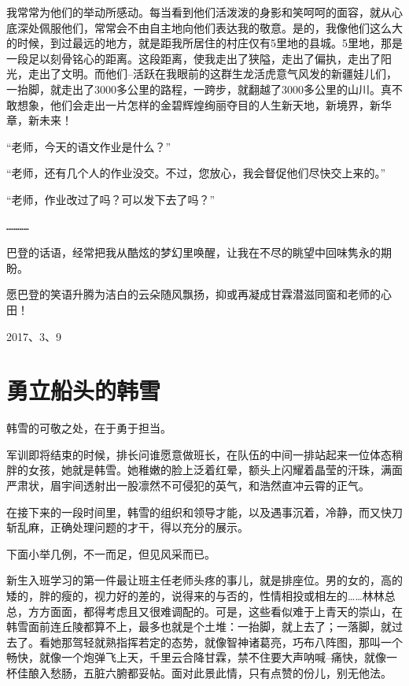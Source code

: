 \documentclass[openany]{ctexbook}
\begin{document}
我常常为他们的举动所感动。每当看到他们活泼泼的身影和笑呵呵的面容，就从心底深处佩服他们，常常会不由自主地向他们表达我的敬意。是的，我像他们这么大的时候，到过最远的地方，就是距我所居住的村庄仅有5里地的县城。5里地，那是一段足以刻骨铭心的距离。这段距离，使我走出了狭隘，走出了偏执，走出了阳光，走出了文明。而他们--活跃在我眼前的这群生龙活虎意气风发的新疆娃儿们，一抬脚，就走出了3000多公里的路程，一跨步，就翻越了3000多公里的山川。真不敢想象，他们会走出一片怎样的金碧辉煌绚丽夺目的人生新天地，新境界，新华章，新未来！

``老师，今天的语文作业是什么？''

``老师，还有几个人的作业没交。不过，您放心，我会督促他们尽快交上来的。''

``老师，作业改过了吗？可以发下去了吗？''

\begin{verbatim}
…………
\end{verbatim}

巴登的话语，经常把我从酷炫的梦幻里唤醒，让我在不尽的眺望中回味隽永的期盼。

愿巴登的笑语升腾为洁白的云朵随风飘扬，抑或再凝成甘霖潜滋同窗和老师的心田！

2017、3、9

\chapter*{勇立船头的韩雪}\label{hanxue}

韩雪的可敬之处，在于勇于担当。

军训即将结束的时候，排长问谁愿意做班长，在队伍的中间一排站起来一位体态稍胖的女孩，她就是韩雪。她稚嫩的脸上泛着红晕，额头上闪耀着晶莹的汗珠，满面严肃状，眉宇间透射出一股凛然不可侵犯的英气，和浩然直冲云霄的正气。

在接下来的一段时间里，韩雪的组织和领导才能，以及遇事沉着，冷静，而又快刀斩乱麻，正确处理问题的才干，得以充分的展示。

下面小举几例，不一而足，但见风采而已。

新生入班学习的第一件最让班主任老师头疼的事儿，就是排座位。男的女的，高的矮的，胖的瘦的，视力好的差的，说得来的与否的，性情相投或相左的\ldots{}\ldots{}林林总总，方方面面，都得考虑且又很难调配的。可是，这些看似难于上青天的崇山，在韩雪面前连丘陵都算不上，最多也就是个土堆：一抬脚，就上去了；一落脚，就过去了。看她那驾轻就熟指挥若定的态势，就像智神诸葛亮，巧布八阵图，那叫一个畅快，就像一个炮弹飞上天，千里云合降甘霖，禁不住要大声呐喊--痛快，就像一杯佳酿入愁肠，五脏六腑都妥帖。面对此景此情，只有点赞的份儿，别无他法。
\end{document}
